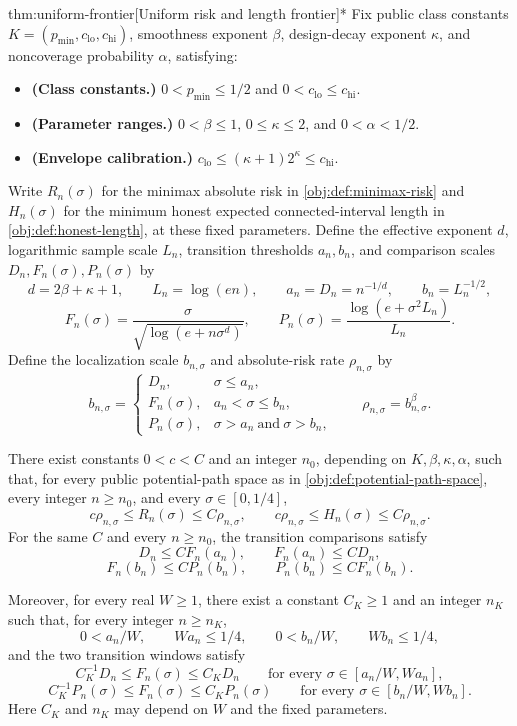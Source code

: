 \documentclass[11pt]{article}
\begin{document}
\begin{theoremv}{thm:uniform-frontier}[Uniform risk and length frontier]*
Fix public class constants \(K=(p_{\min},c_{\mathrm{lo}},c_{\mathrm{hi}})\), smoothness exponent \(\beta\), design-decay exponent \(\kappa\), and noncoverage probability \(\alpha\), satisfying:
\begin{itemize}
\item \textbf{(Class constants.)} \(0<p_{\min}\le 1/2\) and \(0<c_{\mathrm{lo}}\le c_{\mathrm{hi}}\).
\item \textbf{(Parameter ranges.)} \(0<\beta\le1\), \(0\le\kappa\le2\), and \(0<\alpha<1/2\).
\item \textbf{(Envelope calibration.)} \(c_{\mathrm{lo}}\le(\kappa+1)2^\kappa\le c_{\mathrm{hi}}\).
\end{itemize}
Write \(R_n(\sigma)\) for the minimax absolute risk in \cref{obj:def:minimax-risk} and \(H_n(\sigma)\) for the minimum honest expected connected-interval length in \cref{obj:def:honest-length}, at these fixed parameters. Define the effective exponent \(d\), logarithmic sample scale \(L_n\), transition thresholds \(a_n,b_n\), and comparison scales \(D_n,F_n(\sigma),P_n(\sigma)\) by
\[
d=2\beta+\kappa+1,\qquad L_n=\log(en),\qquad
a_n=D_n=n^{-1/d},\qquad b_n=L_n^{-1/2},
\]
\[
F_n(\sigma)=\frac{\sigma}{\sqrt{\log(e+n\sigma^d)}},
\qquad
P_n(\sigma)=\frac{\log(e+\sigma^2L_n)}{L_n}.
\]
Define the localization scale \(b_{n,\sigma}\) and absolute-risk rate \(\rho_{n,\sigma}\) by
\[
b_{n,\sigma}=
\begin{cases}
D_n,&\sigma\le a_n,\\
F_n(\sigma),&a_n<\sigma\le b_n,\\
P_n(\sigma),&\sigma>a_n\ \text{and}\ \sigma>b_n,
\end{cases}
\qquad
\rho_{n,\sigma}=b_{n,\sigma}^{\beta}.
\]

There exist constants \(0<c<C\) and an integer \(n_0\), depending on \(K,\beta,\kappa,\alpha\), such that, for every public potential-path space as in \cref{obj:def:potential-path-space}, every integer \(n\ge n_0\), and every \(\sigma\in[0,1/4]\),
\[
c\rho_{n,\sigma}\le R_n(\sigma)\le C\rho_{n,\sigma},
\qquad
c\rho_{n,\sigma}\le H_n(\sigma)\le C\rho_{n,\sigma}.
\]
For the same \(C\) and every \(n\ge n_0\), the transition comparisons satisfy
\[
D_n\le C F_n(a_n),\qquad F_n(a_n)\le C D_n,
\]
\[
F_n(b_n)\le C P_n(b_n),\qquad P_n(b_n)\le C F_n(b_n).
\]

Moreover, for every real \(W\ge1\), there exist a constant \(C_K\ge1\) and an integer \(n_K\) such that, for every integer \(n\ge n_K\),
\[
0<a_n/W,\qquad Wa_n\le1/4,\qquad
0<b_n/W,\qquad Wb_n\le1/4,
\]
and the two transition windows satisfy
\[
C_K^{-1}D_n\le F_n(\sigma)\le C_KD_n
\qquad
\text{for every }\sigma\in[a_n/W,Wa_n],
\]
\[
C_K^{-1}P_n(\sigma)\le F_n(\sigma)\le C_KP_n(\sigma)
\qquad
\text{for every }\sigma\in[b_n/W,Wb_n].
\]
Here \(C_K\) and \(n_K\) may depend on \(W\) and the fixed parameters.


\end{theoremv}
\end{document}
